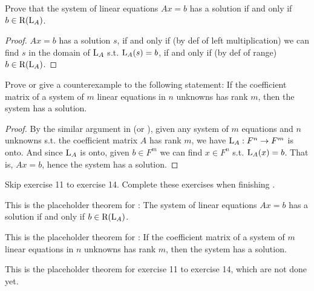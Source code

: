 \begin{exercise} \label{exercise 3.3.9}
Prove that the system of linear equations \(Ax = b\) has a solution if and only if \(b \in \mathrm{R}(\mathrm{L}_A)\).
\end{exercise}

\begin{proof}
\(Ax = b\) has a solution \(s\), if and only if (by def of left multiplication) we can find \(s\) in the domain of \(\mathrm{L}_A\) s.t. \(\mathrm{L}_A(s) = b\), if and only if (by def of range) \(b \in \mathrm{R}(\mathrm{L}_A)\).
\end{proof}

\begin{exercise} \label{exercise 3.3.10}
Prove or give a counterexample to the following statement:
If the coefficient matrix of a system of \(m\) linear equations in \(n\) unknowns has rank \(m\), then the system has a solution.
\end{exercise}

\begin{proof}
By the similar argument in (or ), given any system of \(m\) equations and \(n\) unknowns s.t. the coefficient matrix \(A\) has rank \(m\), we have \(\mathrm{L}_A : F^n \to F^m\) is onto.
And since \(\mathrm{L}_A\) is onto, given \(b \in F^m\) we can find \(x \in F^n\) s.t. \(\mathrm{L}_A(x) = b\).
That is, \(Ax = b\), hence the system has a solution.
\end{proof}

\TODOREF{} Skip exercise 11 to exercise 14.
Complete these exercises when finishing .

\begin{additional theorem} \label{athm 3.12}
This is the placeholder theorem for : The system of linear equations \(Ax = b\) has a solution if and only if \(b \in \mathrm{R}(\mathrm{L}_A)\).
\end{additional theorem}

\begin{additional theorem} \label{athm 3.13}
This is the placeholder theorem for :
If the coefficient matrix of a system of \(m\) linear equations in \(n\) unknowns has rank \(m\), then the system has a solution.
\end{additional theorem}

\begin{additional theorem} \label{athm 3.14}
This is the placeholder theorem for exercise 11 to exercise 14, which are not done yet.
\end{additional theorem}
